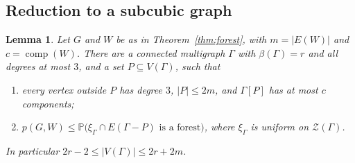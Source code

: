 \documentclass[11pt]{article}
\newtheorem{lemma}[theorem]{Lemma}
\theoremstyle{definition}
\theoremstyle{remark}
\newcommand{\Z}{\mathcal{Z}}
\newcommand{\PP}{\mathbb{P}}
\newcommand{\comp}{\operatorname{comp}}
\begin{document}
\subsection{Reduction to a subcubic graph}

\begin{lemma}\label{lem:reduce}
Let $G$ and $W$ be as in Theorem~\ref{thm:forest}, with $m=|E(W)|$ and $c=\comp(W)$. There are a
connected multigraph $\Gamma$ with $\beta(\Gamma)=r$ and all degrees at most $3$, and a set
$P\subseteq V(\Gamma)$, such that
\begin{enumerate}
\item[\textup{(i)}] every vertex outside $P$ has degree $3$, $|P|\le2m$, and $\Gamma[P]$ has at
most $c$ components;
\item[\textup{(ii)}] $p(G,W)\le\PP\bigl(\xi_\Gamma\cap E(\Gamma-P)\text{ is a forest}\bigr)$, where
$\xi_\Gamma$ is uniform on $\Z(\Gamma)$.
\end{enumerate}
In particular $2r-2\le|V(\Gamma)|\le2r+2m$.
\end{lemma}
\end{document}
